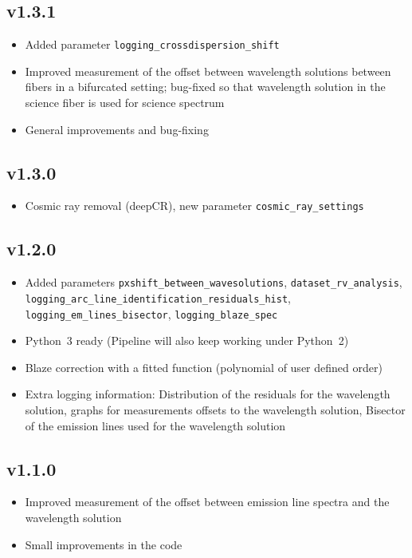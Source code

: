 \documentclass[10pt,a4paper]{article}
\begin{document}
\subsection*{v1.3.1}
\begin{itemize}\setlength\itemsep{0em}
  \item Added parameter \verb|logging_crossdispersion_shift|
  \item Improved measurement of the offset between wavelength solutions between fibers in a bifurcated setting; bug-fixed so that wavelength solution in the science fiber is used for science spectrum
  \item General improvements and bug-fixing
\end{itemize}

\subsection*{v1.3.0}
\begin{itemize}\setlength\itemsep{0em}
  \item Cosmic ray removal (deepCR), new parameter \verb|cosmic_ray_settings|
\end{itemize}

\subsection*{v1.2.0}
\begin{itemize}\setlength\itemsep{0em}
  \item Added parameters \verb|pxshift_between_wavesolutions|, \verb|dataset_rv_analysis|,\\ \verb|logging_arc_line_identification_residuals_hist|, \verb|logging_em_lines_bisector|, \verb|logging_blaze_spec|
  \item Python~3 ready (Pipeline will also keep working under Python~2)
  \item Blaze correction with a fitted function (polynomial of user defined order)
  \item Extra logging information: Distribution of the residuals for the wavelength solution, graphs for measurements offsets to the wavelength solution, Bisector of the emission lines used for the wavelength solution
\end{itemize}

\subsection*{v1.1.0}
\begin{itemize}\setlength\itemsep{0em}
  \item Improved measurement of the offset between emission line spectra and the wavelength solution
  \item Small improvements in the code
\end{itemize}
\end{document}

